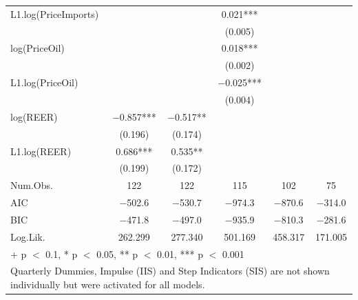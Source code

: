 \begin{table}
{\begin{tabular}[t]{lccccc}
L1.log(PriceImports) &  &  & \num{0.021}*** &  & \\
 &  &  & (\num{0.005}) &  & \\
log(PriceOil) &  &  & \num{0.018}*** &  & \\
 &  &  & (\num{0.002}) &  & \\
L1.log(PriceOil) &  &  & \num{-0.025}*** &  & \\
 &  &  & (\num{0.004}) &  & \\
log(REER) & \num{-0.857}*** & \num{-0.517}** &  &  & \\
 & (\num{0.196}) & (\num{0.174}) &  &  & \\
L1.log(REER) & \num{0.686}*** & \num{0.535}** &  &  & \\
 & (\num{0.199}) & (\num{0.172}) &  &  & \\
\midrule
Num.Obs. & \num{122} & \num{122} & \num{115} & \num{102} & \num{75}\\
AIC & \num{-502.6} & \num{-530.7} & \num{-974.3} & \num{-870.6} & \num{-314.0}\\
BIC & \num{-471.8} & \num{-497.0} & \num{-935.9} & \num{-810.3} & \num{-281.6}\\
Log.Lik. & \num{262.299} & \num{277.340} & \num{501.169} & \num{458.317} & \num{171.005}\\
\bottomrule
\multicolumn{6}{l}{\rule{0pt}{1em}+ p $<$ 0.1, * p $<$ 0.05, ** p $<$ 0.01, *** p $<$ 0.001}\\
\multicolumn{6}{l}{\rule{0pt}{1em}Quarterly Dummies, Impulse (IIS) and Step Indicators (SIS) are not shown individually but were activated for all models.}\\
\end{tabular}}
\end{table}

